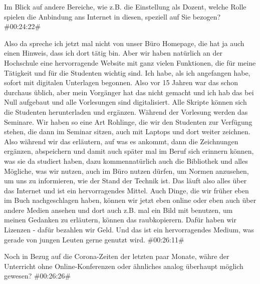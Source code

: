 \documentclass[a4paper, 12pt]{scrartcl}
\begin{document}
\begin{description}
\Fabian Im Blick auf andere Bereiche, wie z.B. die Einstellung als Dozent, welche Rolle spielen die Anbindung ans Internet in diesen, speziell auf Sie bezogen? \#00:24:22\#

\Andre Also da spreche ich jetzt mal nicht von unser Büro Homepage, die hat ja auch einen Hinweis, dass ich dort tätig bin. Aber wir haben natürlich an der Hochschule eine hervorragende Website mit ganz vielen Funktionen, die für meine Tätigkeit und für die Studenten wichtig sind. Ich habe, als ich angefangen habe, sofort mit digitalen Unterlagen begonnen. Also vor 15 Jahren war das schon durchaus üblich, aber mein Vorgänger hat das nicht gemacht und ich hab das bei Null aufgebaut und alle Vorlesungen sind digitalisiert. Alle Skripte können sich die Studenten herunterladen und ergänzen. Während der Vorlesung werden das Seminare. Wir haben so eine Art Rohlinge, die wir den Studenten zur Verfügung stehen, die dann im Seminar sitzen, auch mit Laptops und dort weiter zeichnen. Also während wir das erläutern, auf was es ankommt, dann die Zeichnungen ergänzen, abspeichern und damit auch später mal im Beruf sich erinnern können, was sie da studiert haben, dazu kommennatürlich auch die Bibliothek und alles Mögliche, was wir nutzen, auch im Büro nutzen dürfen, um Normen anzusehen, um uns zu informieren, wie der Stand der Technik ist. Das läuft also alles über das Internet und ist ein hervorragendes Mittel. Auch Dinge, die wir früher eben im Buch nachgeschlagen haben, können wir jetzt eben online oder eben auch über andere Medien ansehen und dort auch z.B. mal ein Bild mit benutzen, um meinen Gedanken zu erläutern, können das raubkopierern. Dafür haben wir Lizenzen - dafür bezahlen wir Geld. Und das ist ein hervorragendes Medium, was gerade von jungen Leuten gerne genutzt wird. \#00:26:11\#

\Fabian Noch in Bezug auf die Corona-Zeiten der letzten paar Monate, währe der Unterricht ohne Online-Konferenzen oder ähnliches analog überhaupt möglich gewesen? \#00:26:26\#


\end{description}
\end{document}
